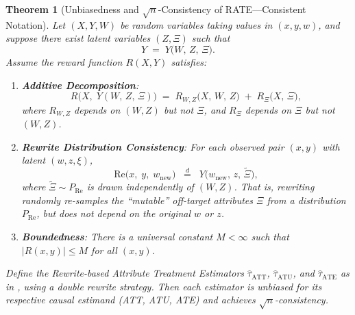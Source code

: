 \documentclass{article}
\newtheorem{theorem}{Theorem}[section]
\theoremstyle{definition}
\begin{document}
    \begin{theorem}[Unbiasedness and \(\sqrt{n}\)-Consistency of RATE---Consistent Notation]
    \label{thm:unbiased_rate_consistent}
    Let \((X, Y, W)\) be random variables taking values in \((x, y, w)\), and suppose there exist latent variables \((Z, \Xi)\) such that
    \[
    Y \;=\; Y\bigl(W,\,Z,\,\Xi\bigr).
    \]
    Assume the reward function \(R(X,Y)\) satisfies:
    
    \begin{enumerate}
    \item[\textbf{(A1)}] \textbf{Additive Decomposition}: 
    \[
    R\bigl(X,\;Y(W,\,Z,\,\Xi)\bigr)
    \;=\;
    R_{W,Z}\bigl(X,\,W,\,Z\bigr)
    \;+\;
    R_{\Xi}\bigl(X,\,\Xi\bigr),
    \]
    where \(R_{W,Z}\) depends on \((W,Z)\) but not \(\Xi\), and \(R_\Xi\) depends on \(\Xi\) but not \((W,Z)\).
    
    \item[\textbf{(A2)}] \textbf{Rewrite Distribution Consistency}: For each observed pair \((x,y)\) with latent \((w,z,\xi)\),  
    \[
    \text{Re}\bigl(x,\;y,\;w_{\text{new}}\bigr)
    \;\;\stackrel{d}{=}\;\;
    Y\bigl(w_{\text{new}},\,z,\,\widetilde{\Xi}\bigr),
    \]
    where \(\widetilde{\Xi}\sim P_{\mathrm{Re}}\) is drawn independently of \((W,Z)\).  That is, rewriting randomly re-samples the ``mutable'' off-target attributes \(\Xi\) from a distribution \(P_{\mathrm{Re}}\), but does not depend on the original \(w\) or \(z\).
    
    \item[\textbf{(A3)}] \textbf{Boundedness}: There is a universal constant \(M<\infty\) such that \(\bigl|R(x,y)\bigr|\le M\) for all \((x,y)\).
    \end{enumerate}
    
    Define the Rewrite-based Attribute Treatment Estimators \(\hat{\tau}_{\text{ATT}}\), \(\hat{\tau}_{\text{ATU}}\), and \(\hat{\tau}_{\text{ATE}}\) as in , using a \emph{double rewrite} strategy. Then each estimator is unbiased for its respective causal estimand (ATT, ATU, ATE) and achieves \(\sqrt{n}\)-consistency.
    \end{theorem}
    
\end{document}
